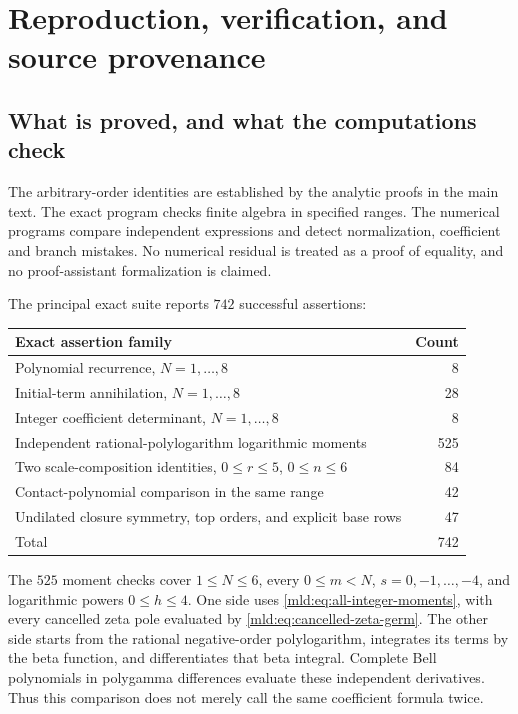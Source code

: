 \section{Reproduction, verification, and source provenance}
\label{mld:app:reproduction}

\subsection{What is proved, and what the computations check}

The arbitrary-order identities are established by the analytic proofs in
the main text. The exact program checks finite algebra in specified
ranges. The numerical programs compare independent expressions and
detect normalization, coefficient and branch mistakes. No numerical
residual is treated as a proof of equality, and no proof-assistant
formalization is claimed.

The principal exact suite reports $742$ successful assertions:
\begin{center}
\begin{tabularx}{\textwidth}{@{}Yr@{}}
\toprule
Exact assertion family & Count\\
\midrule
Polynomial recurrence, $N=1,\ldots,8$ & 8\\
Initial-term annihilation, $N=1,\ldots,8$ & 28\\
Integer coefficient determinant, $N=1,\ldots,8$ & 8\\
Independent rational-polylogarithm logarithmic moments & 525\\
Two scale-composition identities, $0\le r\le5$, $0\le n\le6$ & 84\\
Contact-polynomial comparison in the same range & 42\\
Undilated closure symmetry, top orders, and explicit base rows & 47\\
\midrule
Total & 742\\
\bottomrule
\end{tabularx}
\end{center}
The $525$ moment checks cover $1\le N\le6$, every $0\le m<N$,
$s=0,-1,\ldots,-4$, and logarithmic powers $0\le h\le4$.
One side uses \eqref{mld:eq:all-integer-moments}, with every cancelled zeta
pole evaluated by \eqref{mld:eq:cancelled-zeta-germ}. The other side starts
from the rational negative-order polylogarithm, integrates its terms by
the beta function, and differentiates that beta integral. Complete Bell
polynomials in polygamma differences evaluate these independent
derivatives. Thus this comparison does not merely call the same
coefficient formula twice.

